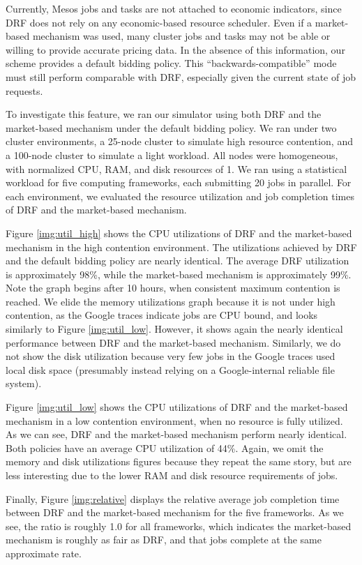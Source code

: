 \documentclass{acm_proc_article-sp}
\begin{document}
Currently, Mesos jobs and tasks are not attached to economic indicators, since DRF does not rely on any economic-based resource scheduler. Even if a market-based mechanism was used, many cluster jobs and tasks may not be able or willing to provide accurate pricing data. In the absence of this information, our scheme provides a default bidding policy. This ``backwards-compatible'' mode must still perform comparable with DRF, especially given the current state of job requests.

To investigate this feature, we ran our simulator using both DRF and the market-based mechanism under the default bidding policy. We ran under two cluster environments, a 25-node cluster to simulate high resource contention, and a 100-node cluster to simulate a light workload. All nodes were homogeneous, with normalized CPU, RAM, and disk resources of 1. We ran using a statistical workload for five computing frameworks, each submitting 20 jobs in parallel. For each environment, we evaluated the resource utilization and job completion times of DRF and the market-based mechanism.

Figure \ref{img:util_high} shows the CPU utilizations of DRF and the market-based mechanism in the high contention environment.  The utilizations achieved by DRF and the default bidding policy are nearly identical. The average DRF utilization is approximately 98\%, while the market-based mechanism is approximately 99\%. Note the graph begins after 10 hours, when consistent maximum contention is reached. We elide the memory utilizations graph because it is not under high contention, as the Google traces indicate jobs are CPU bound, and looks similarly to Figure \ref{img:util_low}. However, it shows again the nearly identical performance between DRF and the market-based mechanism. Similarly, we do not show the disk utilization because very few jobs in the Google traces used local disk space (presumably instead relying on a Google-internal reliable file system).

Figure \ref{img:util_low} shows the CPU utilizations of DRF and the market-based mechanism in a low contention environment, when no resource is fully utilized. As we can see, DRF and the market-based mechanism perform nearly identical. Both policies have an average CPU utilization of 44\%. Again, we omit the memory and disk utilizations figures because they repeat the same story, but are less interesting due to the lower RAM and disk resource requirements of jobs.

Finally, Figure \ref{img:relative} displays the relative average job completion time between DRF and the market-based mechanism for the five frameworks. As we see, the ratio is roughly 1.0 for all frameworks, which indicates the market-based mechanism is roughly as fair as DRF, and that jobs complete at the same approximate rate.
\end{document}

